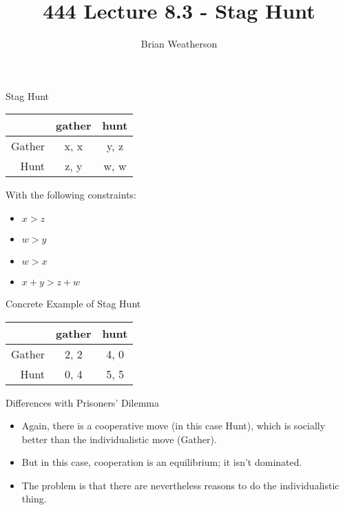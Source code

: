 \documentclass[
  ignorenonframetext,
]{beamer}
\title{444 Lecture 8.3 - Stag Hunt}
\author{Brian Weatherson}
\date{}
\providecommand{\tightlist}{%
  \setlength{\itemsep}{0pt}\setlength{\parskip}{0pt}}
\begin{document}
\frame{\titlepage}

\begin{frame}{Stag Hunt}
\protect\hypertarget{stag-hunt}{}
\begin{table}[!h]
\centering
\begin{tabular}[t]{>{}r|cc}
\toprule
 & gather & hunt\\
\midrule
Gather & x, x & y, z\\
Hunt & z, y & w, w\\
\bottomrule
\end{tabular}
\end{table}

With the following constraints:

\begin{itemize}
\tightlist
\item
  \(x > z\)
\item
  \(w > y\)
\item
  \(w > x\)
\item
  \(x + y > z + w\)
\end{itemize}
\end{frame}

\begin{frame}{Concrete Example of Stag Hunt}
\protect\hypertarget{concrete-example-of-stag-hunt}{}
\begin{table}[!h]
\centering
\begin{tabular}[t]{>{}r|cc}
\toprule
 & gather & hunt\\
\midrule
Gather & 2, 2 & 4, 0\\
Hunt & 0, 4 & 5, 5\\
\bottomrule
\end{tabular}
\end{table}
\end{frame}

\begin{frame}{Differences with Prisoners' Dilemma}
\protect\hypertarget{differences-with-prisoners-dilemma}{}
\begin{itemize}
\tightlist
\item
  Again, there is a cooperative move (in this case Hunt), which is
  socially better than the individualistic move (Gather).
\item
  But in this case, cooperation is an equilibrium; it isn't dominated.
\item
  The problem is that there are nevertheless reasons to do the
  individualistic thing.
\end{itemize}
\end{frame}
\end{document}
